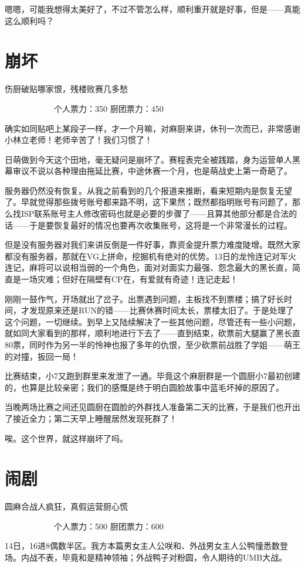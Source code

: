 嗯嗯，可能我想得太美好了，不过不管怎么样，顺利重开就是好事，但是——真能这么顺利吗？


\section{崩坏}
伤厨破贴哪家恨，残楼败赛几多愁

　　　　　　个人票力：350 厨团票力：450

确实如同贴吧上某段子一样，才一个月嘛，对麻厨来讲，休刊一次而已，非常感谢小林立老师！老师辛苦了！我们习惯了！ 

日萌做到今天这个田地，毫无疑问是崩坏了。赛程表完全被践踏，身为运营单人黑幕审议不说以各种理由拖延比赛，中途休赛一个月，也是萌战史上第一奇葩了。

服务器仍然没有恢复。从我之前看到的几个报道来推断，看来短期内是恢复无望了。早就觉得那些拨号账号都来路不明，这下果然；既然都指明账号有问题了，那么找ISP联系账号主人修改密码也就是必要的步骤了——且算其他部分都是合法的话——于是要恢复最好的情况也要再次收集账号，这将是一个非常漫长的过程。

但是没有服务器对我们来讲反倒是一件好事，靠资金提升票力难度陡增。既然大家都没有服务器，那就在VG上拼命，挖掘机有绝对的优势。13日的龙怜连记对军火连记，麻将可以说相当弱的一个角色，面对对面实力最强、怨念最大的黑长直，简直是一场灾难；但好在隔壁有CP在，有爱就有奇迹！连记走起！

刚刚一鼓作气，开场就出了岔子。出票遇到问题，主板找不到票楼；搞了好长时间，才发现原来还是RUN的错——比赛休赛时间太长，票楼太旧了。于是处理了这个问题，一切继续。到早上又陆续解决了一些其他问题，尽管还有一些小问题，就如同大家看到的那样，顺利地进行下去了——直到结束，砍票前大腿赢了黑长直80票，同时作为另一半的怜神也报了多年的仇恨，至少砍票前战胜了学姐——萌王的对撞，扳回一局！

比赛结束，小7又跑到群里来发泄了一通。毕竟这个麻厨群是一个圆厨小7最初创建的，也算是比较亲密；我们的感慨是终于明白圆脸故事中蓝毛坏掉的原因了。

当晚两场比赛之间还见圆厨在圆脸的外群找人准备第二天的比赛，于是我们也开出了接近全力；第二天早上睡醒居然发现死群了！

唉。这个世界，就这样崩坏了吗。


\section{闹剧}
圆麻合战人疯狂，真假运营厨心慌

　　　　　　个人票力：500 厨团票力：600

14日，16进8偶数半区。我方本篇男女主人公咲和、外战男女主人公鸭憧悉数登场。内战不表，毕竟和是精神领袖；外战鸭子对粉圆，令人期待的UMB大战。

